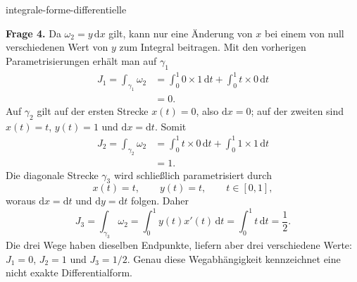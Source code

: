 \begin{exo}{integrale-forme-differentielle}
\begin{solution}
\textbf{Frage 4.} Da $\omega_2=y\,\mathrm{d}x$ gilt, kann nur eine Änderung
von $x$ bei einem von null verschiedenen Wert von $y$ zum Integral beitragen.
Mit den vorherigen Parametrisierungen erhält man auf $\gamma_1$
\[
\begin{aligned}
J_1=\int_{\gamma_1}\omega_2
&=\int_0^1 0\times1\,\mathrm{d}t+\int_0^1 t\times0\,\mathrm{d}t\\
&=0.
\end{aligned}
\]
Auf $\gamma_2$ gilt auf der ersten Strecke $x(t)=0$, also $\mathrm{d}x=0$;
auf der zweiten sind $x(t)=t$, $y(t)=1$ und $\mathrm{d}x=\mathrm{d}t$. Somit
\[
\begin{aligned}
J_2=\int_{\gamma_2}\omega_2
&=\int_0^1 t\times0\,\mathrm{d}t+\int_0^1 1\times1\,\mathrm{d}t\\
&=1.
\end{aligned}
\]
Die diagonale Strecke $\gamma_3$ wird schließlich parametrisiert durch
\[
x(t)=t,\qquad y(t)=t,\qquad t\in[0,1],
\]
woraus $\mathrm{d}x=\mathrm{d}t$ und $\mathrm{d}y=\mathrm{d}t$ folgen. Daher
\[
J_3=\int_{\gamma_3}\omega_2
=\int_0^1y(t)x'(t)\,\mathrm{d}t
=\int_0^1t\,\mathrm{d}t=\frac12.
\]
Die drei Wege haben dieselben Endpunkte, liefern aber drei verschiedene Werte:
$J_1=0$, $J_2=1$ und $J_3=1/2$. Genau diese Wegabhängigkeit kennzeichnet eine
nicht exakte Differentialform.
\end{solution}
\end{exo}

